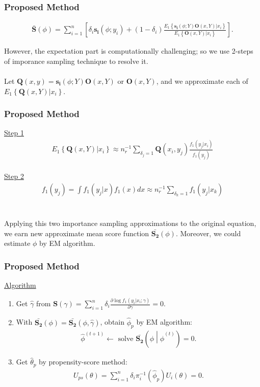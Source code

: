 \documentclass{beamer}
\newcommand{\bra}[1]{\left(#1\right)}
\newcommand{\cbra}[1]{\left\{#1\right\}}
\newcommand{\sbra}[1]{\left[#1\right]}
\newcommand{\e}[1]{$\displaystyle{#1}$}
\newcommand{\al}[1]{\begin{align*}#1\end{align*}}
\begin{document}
\begin{frame}
\frametitle{Proposed Method}
\al{\bar{\bm{S}}\bra{\phi}=\sum_{i=1}^{n} \sbra{
	\delta_{i}\bm{s_i}\bra{\phi; y_i} +
	\bra{1-\delta_i}\frac{E_1\cbra{\bm{s_i}\bra{\phi; Y}\bm{O}\bra{x, Y}|x_i}}
					   {E_1\cbra{\bm{O}\bra{x, Y}|x_i}}}.}\smallskip

However, the expectation part is computationally challenging; so we use 2-steps of imporance sampling technique to resolve it.\\~\\

Let \e{\bm{Q}(x, y) = \bm{s_i}\bra{\phi; Y}\bm{O}\bra{x, Y}} or \e{\bm{O}\bra{x, Y}}, and we approximate each of \e{E_1\cbra{\bm{Q}(x, Y)|x_i}}.
\end{frame}

\begin{frame}
\frametitle{Proposed Method}
\underline{Step 1}
\al{E_1\cbra{\bm{Q}(x, Y)|x_i} \approx n_{r}^{-1}\sum_{\delta_j=1} \bm{Q}\bra{x_i, y_j} \frac{f_1\bra{y_j|x_i}}{f_1\bra{y_j}}}\\

\underline{Step 2}
\al{f_1\bra{y_j} = \int f_1\bra{y_j|x} f_1\bra{x} dx \approx n_{r}^{-1} \sum_{\delta_k=1}f_1\bra{y_j|x_k}}\\~\\

Applying this two importance sampling approximations to the original equation, we earn new approximate mean score function \e{\bar{\bm{S_2}}\bra{\phi}}. Moreover, we could estimate \e{\phi} by EM algorithm.
\end{frame}

\begin{frame}
\frametitle{Proposed Method}
\underline{Algorithm}
\begin{enumerate}
\item Get \e{\hat\gamma} from \e{
	\bm{S}\bra{\gamma} = \sum_{i=1}^{n} \delta_i \frac{\partial \log f_1\bra{y_i|x_i;\gamma}}{\partial \gamma} = 0.}
\item With \e{\bar{\bm{S_2}}\bra{\phi} = \bar{\bm{S_2}}\bra{\phi, \hat\gamma}}, obtain \e{\hat\phi_p} by EM algorithm:
		\al{\hat\phi^{(t+1)} \leftarrow \text{ solve } \bar{\bm{S_2}}\bra{\phi \middle| \hat\phi^{(t)}} = 0.}
\item Get \e{\hat\theta_p} by propensity-score method:
		\al{U_{ps}\bra{\theta}=\sum_{i=1}^{n} \delta_{i} {\pi_{i}^{-1}\bra{\hat\phi_p}U_i\bra{\theta}} = 0.}
\end{enumerate}\bigskip
\end{frame}
\end{document}
